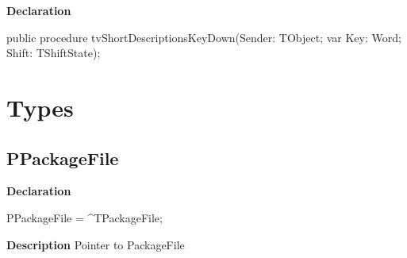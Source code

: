 \documentclass{report}
\newif\ifpdf
\begin{document}
\label{prjwizard.TfrmProjectWizard-tvShortDescriptionsKeyDown}
\begin{list}{}{
\setlength{\itemindent}{0cm}
\setlength{\listparindent}{0cm}
\setlength{\leftmargin}{\evensidemargin}
\addtolength{\leftmargin}{\tmplength}
\settowidth{\labelsep}{X}
\addtolength{\leftmargin}{\labelsep}
\setlength{\labelwidth}{\tmplength}
}
\item[\textbf{Declaration}\hfill]
\ifpdf
\begin{flushleft}
\fi
\begin{ttfamily}
public procedure tvShortDescriptionsKeyDown(Sender: TObject; var Key: Word; Shift: TShiftState);\end{ttfamily}

\ifpdf
\end{flushleft}
\fi

\end{list}
\section{Types}
\ifpdf
\subsection*{\large{\textbf{PPackageFile}}\normalsize\hspace{1ex}\hrulefill}
\else
\subsection*{PPackageFile}
\fi
\label{prjwizard-PPackageFile}
\begin{list}{}{
\setlength{\itemindent}{0cm}
\setlength{\listparindent}{0cm}
\setlength{\leftmargin}{\evensidemargin}
\addtolength{\leftmargin}{\tmplength}
\settowidth{\labelsep}{X}
\addtolength{\leftmargin}{\labelsep}
\setlength{\labelwidth}{\tmplength}
}
\item[\textbf{Declaration}\hfill]
\ifpdf
\begin{flushleft}
\fi
\begin{ttfamily}
PPackageFile = {\^{}}TPackageFile;\end{ttfamily}

\ifpdf
\end{flushleft}
\fi

\par
\item[\textbf{Description}]
Pointer to PackageFile

\end{list}
\end{document}
